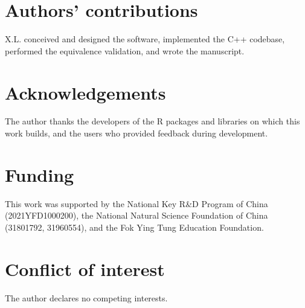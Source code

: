\section*{Authors' contributions}
X.L. conceived and designed the software, implemented the C++ codebase,
performed the equivalence validation, and wrote the manuscript.

\section*{Acknowledgements}
The author thanks the developers of the R packages and libraries on which
this work builds, and the users who provided feedback during development.

\section*{Funding}
This work was supported by the National Key R\&D Program of China
(2021YFD1000200), the National Natural Science Foundation of China
(31801792, 31960554), and the Fok Ying Tung Education Foundation.

\section*{Conflict of interest}
The author declares no competing interests.
